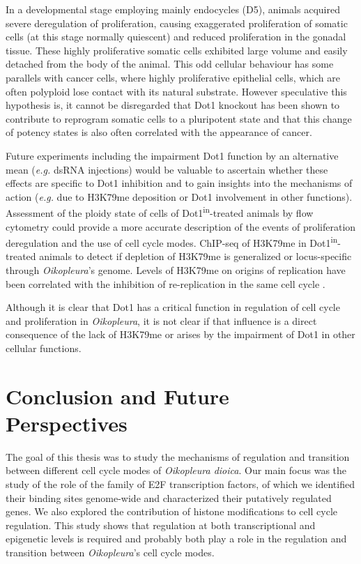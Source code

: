 \documentclass[11pt,twoside,a4paper]{report}
\begin{document}
In a developmental stage employing mainly endocycles (D5), animals acquired severe deregulation of proliferation, causing exaggerated proliferation of somatic cells (at this stage normally quiescent) and reduced proliferation in the gonadal tissue. These highly proliferative somatic cells exhibited large volume and easily detached from the body of the animal. This odd cellular behaviour has some parallels with cancer cells, where highly proliferative epithelial cells, which are often polyploid lose contact with its natural substrate. However speculative this hypothesis is, it cannot be disregarded that Dot1 knockout has been shown to contribute to reprogram somatic cells to a pluripotent state \cite{Onder2012} and that this change of potency states is also often correlated with the appearance of cancer.

Future experiments including the impairment Dot1 function by an alternative mean (\textit{e.g.} dsRNA injections) would be valuable to ascertain whether these effects are specific to Dot1 inhibition and to gain insights into the mechanisms of action (\textit{e.g.} due to H3K79me deposition or Dot1 involvement in other functions). Assessment of the ploidy state of cells of Dot1\textsuperscript{in}-treated animals by flow cytometry could provide a more accurate description of the events of proliferation deregulation and the use of cell cycle modes. ChIP-seq of H3K79me in Dot1\textsuperscript{in}-treated animals to detect if depletion of H3K79me is generalized or locus-specific through \textit{Oikopleura}'s genome. Levels of H3K79me on origins of replication have been correlated with the inhibition of re-replication in the same cell cycle \cite{Fu2013a}.

Although it is clear that Dot1 has a critical function in regulation of cell cycle and proliferation in \textit{Oikopleura}, it is not clear if that influence is a direct consequence of the lack of H3K79me or arises by the impairment of Dot1 in other cellular functions. 

\cleardoublepage

\chapter{Conclusion and Future Perspectives}
The goal of this thesis was to study the mechanisms of regulation and transition between different cell cycle modes of \textit{Oikopleura dioica}. Our main focus was the study of the role of the family of E2F transcription factors, of which we identified their binding sites genome-wide and characterized their putatively regulated genes. We also explored the contribution of histone modifications to cell cycle regulation. This study shows that regulation at both transcriptional and epigenetic levels is required and probably both play a role in the regulation and transition between \textit{Oikopleura}'s cell cycle modes.
\end{document}
